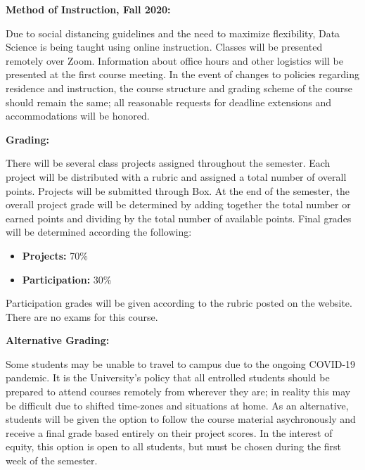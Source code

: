 \documentclass[12pt, a4paper]{article}
\begin{document}
\textbf{Method of Instruction, Fall 2020:} \vspace{6pt}

Due to social distancing guidelines and the need to maximize flexibility, Data Science is
being taught using online instruction. Classes will be presented remotely over Zoom.
Information about office hours and other logistics will be presented at the first course
meeting. In the event of changes to policies regarding residence and instruction, the
course structure and grading scheme of the course should remain the same; all reasonable
requests for deadline extensions and accommodations will be honored.

\bigskip

\textbf{Grading:} \vspace{6pt}

There will be several class projects assigned throughout the semester. Each project will be
distributed with a rubric and assigned a total number of overall points. Projects will be
submitted through Box. At the end of the semester, the overall project grade will be
determined by adding together the total number or earned points and dividing by the total
number of available points. Final grades will be determined according the following:

\begin{itemize}\setlength\itemsep{0em}
  \item \textbf{Projects:} 70\%
  \item \textbf{Participation:} 30\%
\end{itemize}

Participation grades will be given according to the rubric posted on the website.
There are no exams for this course.

\bigskip

\textbf{Alternative Grading:} \vspace{6pt}

Some students may be unable to travel to campus due to the ongoing COVID-19 pandemic. It is
the University's policy that all entrolled students should be prepared to attend courses
remotely from wherever they are; in reality this may be difficult due to shifted
time-zones and situations at home. As an alternative, students will be given the option to
follow the course material asychronously and receive a final grade based entirely on their
project scores. In the interest of equity, this option is open to all students, but must be
chosen during the first week of the semester.
\end{document}
